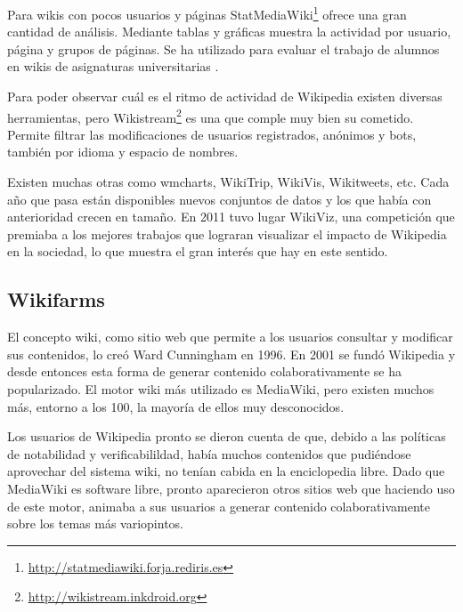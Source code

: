 \documentclass[11pt,onecolumn]{article}
\begin{document}
Para wikis con pocos usuarios y páginas StatMediaWiki\footnote{\href{http://statmediawiki.forja.rediris.es}{http://statmediawiki.forja.rediris.es}} ofrece una gran cantidad de análisis. Mediante tablas y gráficas muestra la actividad por usuario, página y grupos de páginas. Se ha utilizado para evaluar el trabajo de alumnos en wikis de asignaturas universitarias \citep{rodriguez2011, palomoile2012, palomorevision2012, palomorusc2012}.

Para poder observar cuál es el ritmo de actividad de Wikipedia existen diversas herramientas, pero Wikistream\footnote{\href{http://wikistream.inkdroid.org}{http://wikistream.inkdroid.org}} es una que comple muy bien su cometido. Permite filtrar las modificaciones de usuarios registrados, anónimos y bots, también por idioma y espacio de nombres.


Existen muchas otras como wmcharts, WikiTrip, WikiVis, Wikitweets, etc. Cada año que pasa están disponibles nuevos conjuntos de datos y los que había con anterioridad crecen en tamaño. En 2011 tuvo lugar WikiViz, una competición que premiaba a los mejores trabajos que lograran visualizar el impacto de Wikipedia en la sociedad, lo que muestra el gran interés que hay en este sentido.

\subsection{Wikifarms}


El concepto wiki, como sitio web que permite a los usuarios consultar y modificar sus contenidos, lo creó Ward Cunningham en 1996. En 2001 se fundó Wikipedia y desde entonces esta forma de generar contenido colaborativamente se ha popularizado. El motor wiki más utilizado es MediaWiki, pero existen muchos más, entorno a los 100, la mayoría de ellos muy desconocidos.

Los usuarios de Wikipedia pronto se dieron cuenta de que, debido a las políticas de notabilidad y verificabilildad, había muchos contenidos que pudiéndose aprovechar del sistema wiki, no tenían cabida en la enciclopedia libre. Dado que MediaWiki es software libre, pronto aparecieron otros sitios web que haciendo uso de este motor, animaba a sus usuarios a generar contenido colaborativamente sobre los temas más variopintos.
\end{document}
